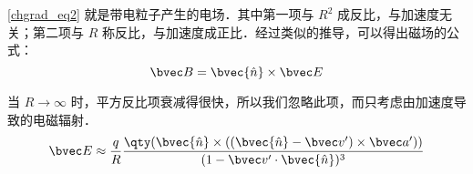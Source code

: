 \autoref{chgrad_eq2}  就是带电粒子产生的电场．其中第一项与 $R^2$ 成反比，与加速度无关；第二项与 $R$ 称反比，与加速度成正比．经过类似的推导，可以得出磁场的公式：
\begin{equation}
\bvec B=\bvec{\hat n} \times \bvec E
\end{equation}

当 $R\rightarrow \infty$ 时，平方反比项衰减得很快，所以我们忽略此项，而只考虑由加速度导致的电磁辐射．
\begin{equation}
\bvec E\approx \frac{q}{R}\frac{\qty(\bvec{\hat n}\times ((\bvec{\hat n}-\bvec v')\times \bvec a'))}{(1-\bvec v'\cdot \bvec{\hat n})^3}
\end{equation}